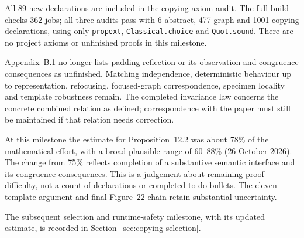 

All 89 new declarations are included in the copying axiom audit. The
full build checks 362 jobs; all three audits pass with 6 abstract, 477 graph
and 1001 copying declarations, using only \texttt{propext},
\texttt{Classical.choice} and \texttt{Quot.sound}. There are no project axioms
or unfinished proofs in this milestone.

Appendix~B.1 no longer lists padding reflection or its observation and
congruence consequences as unfinished. Matching independence, deterministic
behaviour up to representation, refocusing, focused-graph correspondence,
specimen locality and template robustness remain. The completed invariance
law concerns the concrete combined relation as defined; correspondence with
the paper must still be maintained if that relation needs correction.

At this milestone the estimate for Proposition~12.2 was about 78\% of the mathematical
effort, with a broad plausible range of 60--88\% (26 October 2026). The change
from 75\% reflects completion of a substantive semantic interface and its
congruence consequences. This is a judgement about remaining proof difficulty,
not a count of declarations or completed to-do bullets. The eleven-template
argument and final Figure~22 chain retain substantial uncertainty.


The subsequent selection and runtime-safety milestone, with its updated
estimate, is recorded in Section~\ref{sec:copying-selection}.
